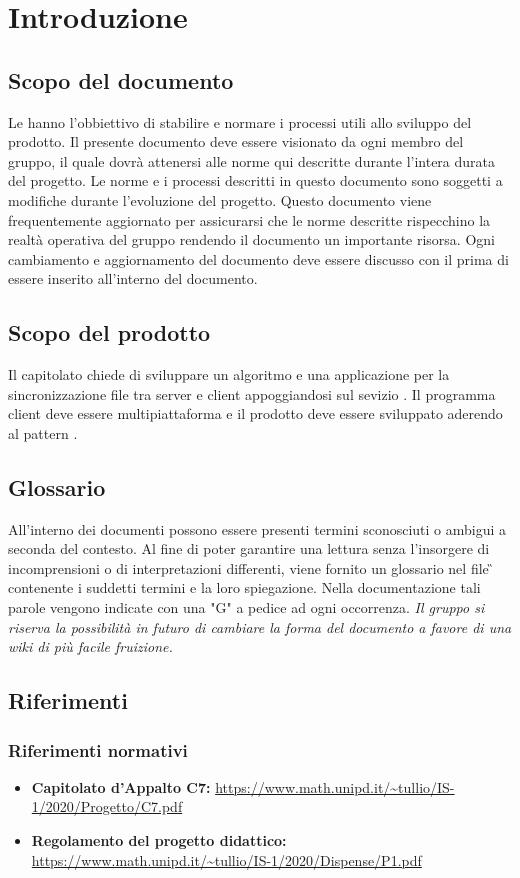 \section{Introduzione}
\subsection{Scopo del documento}
Le \NdP{} hanno l'obbiettivo di stabilire e normare i processi utili allo sviluppo del prodotto.
Il presente documento deve essere visionato da ogni membro del gruppo, il quale dovrà attenersi alle norme qui descritte durante l'intera durata del progetto.
Le norme e i processi descritti in questo documento sono soggetti a modifiche durante l'evoluzione del progetto.
Questo documento viene frequentemente aggiornato per assicurarsi che le norme descritte rispecchino la realtà operativa del gruppo rendendo il documento un importante risorsa.
Ogni cambiamento e aggiornamento del documento deve essere discusso con il \RdP{} prima di essere inserito all'interno del documento.
\subsection{Scopo del prodotto}
Il capitolato chiede di sviluppare un algoritmo e una applicazione per la sincronizzazione file tra server e client appoggiandosi sul sevizio .
Il programma client deve essere multipiattaforma e il prodotto deve essere sviluppato aderendo al pattern .
\subsection{Glossario}
All'interno dei documenti possono essere presenti termini sconosciuti o ambigui a seconda del contesto. Al fine di poter garantire una lettura senza l'insorgere di incomprensioni o di interpretazioni differenti, viene fornito un glossario nel file \G{} contenente i suddetti termini e la loro spiegazione. Nella documentazione tali parole vengono indicate con una "G" a pedice ad ogni occorrenza. \newline
\textit{Il gruppo si riserva la possibilità in futuro di cambiare la forma del documento a favore di una wiki di più facile fruizione.}
\subsection{Riferimenti}
\subsubsection{Riferimenti normativi}
\begin{itemize}
	\item \textbf{Capitolato d'Appalto C7:} \url{https://www.math.unipd.it/~tullio/IS-1/2020/Progetto/C7.pdf}
	\item \textbf{Regolamento del progetto didattico:} \url{https://www.math.unipd.it/~tullio/IS-1/2020/Dispense/P1.pdf}
\end{itemize}
